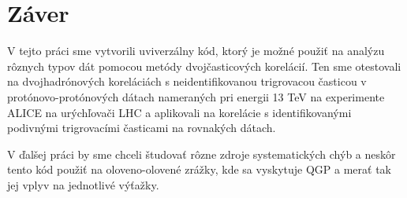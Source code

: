 \documentclass[thesismargins, thesislinespacing]{rnthesis}
\begin{document}
\chapter{Záver}

V tejto práci sme vytvorili uviverzálny kód, ktorý je možné použiť na analýzu rôznych typov dát pomocou metódy dvojčasticových korelácií. Ten sme otestovali na dvojhadrónových koreláciách s neidentifikovanou trigrovacou časticou v protónovo-protónových dátach nameraných pri energii 13 TeV na experimente ALICE na urýchľovači LHC a aplikovali na korelácie s identifikovanými podivnými trigrovacími časticami na rovnakých dátach.

V ďalšej práci by sme chceli študovať rôzne zdroje systematických chýb a neskôr tento kód použiť na oloveno-olovené zrážky, kde sa vyskytuje QGP a merať tak jej vplyv na jednotlivé výťažky. 



%

\end{document}
